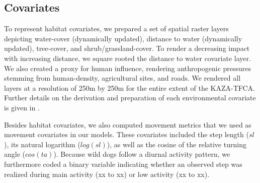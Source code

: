\documentclass[abstract=on,10pt,a4paper,bibliography=totocnumbered]{article}
\begin{document}
\subsection{Covariates}
To represent habitat covariates, we prepared a set of spatial raster layers
depicting water-cover (dynamically updated), distance to water (dynamically
updated), tree-cover, and shrub/grassland-cover. To render a decreasing impact
with increasing distance, we square rooted the distance to water covariate
layer. We also created a proxy for human influence, rendering anthropogenic
pressures stemming from human-density, agricultural sites, and roads. We
rendered all layers at a resolution of 250m by 250m for the entire extent of the
KAZA-TFCA. Further details on the derivation and preparation of each
environmental covariate is given in \cite{Hofmann.2020}.

Besides habitat covariates, we also computed movement metrics that we used as
movement covariates in our models. These covariates included the step length
(\(sl\)), its natural logarithm (\(log(sl)\)), as well as the cosine of the
relative turning angle (\(cos(ta)\)). Because wild dogs follow a diurnal
activity pattern, we furthermore coded a binary variable indicating whether an
observed step was realized during main activity (xx to xx) or low activity (xx
to xx).
\end{document}
